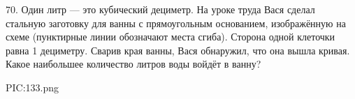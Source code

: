 70. Один литр --- это кубический дециметр. На уроке труда Вася сделал стальную заготовку для ванны с прямоугольным основанием, изображённую на схеме (пунктирные линии обозначают места сгиба). Сторона одной клеточки равна 1 дециметру. Сварив края ванны, Вася обнаружил, что она вышла кривая. Какое наибольшее количество литров воды войдёт в ванну?
\begin{center}
{{PIC:133.png}}
\end{center}
\newpage
\noindent
